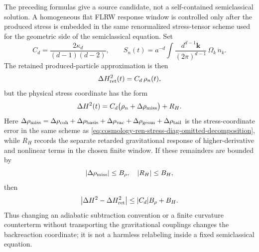 \begin{controlledapproximation}
\label{ca:cosmology-produced-stress-backreaction-window}
The preceding formulas give a source candidate, not a self-contained
semiclassical solution.  A homogeneous flat FLRW response window is controlled
only after the produced stress is embedded in the same renormalized
stress-tensor scheme used for the geometric side of the semiclassical equation.
Set
\begin{equation}
  C_d=\frac{2\kappa_d}{(d-1)(d-2)},\qquad
  S_n(t)=
  a^{-d}
  \int
  \frac{d^{d-1}\mathbf k}{(2\pi)^{d-1}}\,
  \Omega_k\,\dot n_k .
  \label{eq:cosmology-produced-source-coordinate}
\end{equation}
The retained produced-particle approximation is then
\begin{equation}
  \Delta H_{\rm ret}^2(t)=C_d\,\rho_n(t),
  \label{eq:cosmology-retained-produced-hubble-response}
\end{equation}
but the physical stress coordinate has the form
\begin{equation}
  \Delta H^2(t)
  =
  C_d\bigl(\rho_n+\Delta\rho_{\rm miss}\bigr)
  +R_H .
  \label{eq:cosmology-produced-backreaction-budget}
\end{equation}
Here
\(\Delta\rho_{\rm miss}=\Delta\rho_{\rm coh}+\Delta\rho_{\rm basis}
+\Delta\rho_{\rm vac}+\Delta\rho_{\rm geom}+\Delta\rho_{\rm tail}\) is the
stress-coordinate error in the same scheme as
\eqref{eq:cosmology-ren-stress-diag-omitted-decomposition}, while \(R_H\)
records the separate retarded gravitational response of higher-derivative and
nonlinear terms in the chosen finite window.  If these remainders are bounded by
\[
  |\Delta\rho_{\rm miss}|\le B_\rho,\quad
  |R_H|\le B_H ,
\]
then
\begin{equation}
  \bigl|\Delta H^2-\Delta H_{\rm ret}^2\bigr|
  \le
  |C_d|B_\rho+B_H .
  \label{eq:cosmology-produced-hubble-error-bound}
\end{equation}
Thus changing an adiabatic subtraction convention or a finite curvature
counterterm without transporting the gravitational couplings changes the
backreaction coordinate; it is not a harmless relabeling inside a fixed
semiclassical equation.


\end{controlledapproximation}
